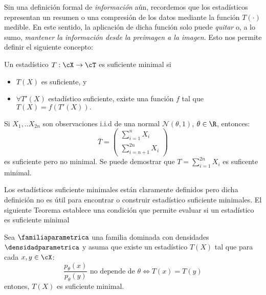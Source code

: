Sin una definición formal de \textit{información} aún, recordemos que los estadísticos representan un resumen o una compresión  de los datos mediante la función $T(\cdot)$ medible. En este sentido, la aplicación de dicha función solo puede \textit{quitar} o, a lo sumo, \textit{mantener la información desde la preimagen a la imagen}. Esto nos permite definir el siguiente concepto:

\begin{definition}
	Un estadístico $T:\cX\rightarrow\cT$ es suficiente minimal si
	\begin{itemize}
		\item $T(X)$ es suficiente, y
		\item $\forall T'(X)$ estadístico suficiente, existe una función $f$ tal que $T(X) = f(T'(X)).$ 
	\end{itemize}
\end{definition}  

\begin{example}
Si $X_1,..X_{2n}$ son observaciones i.i.d de una normal $\mathcal{N}(\theta,1)$, $\theta \in \R$, entonces:
$$
\bar{T}=
\begin{pmatrix}
\sum_{i=1}^{n} X_i\\ 
\sum_{i=n+1}^{2n}X_i
\end{pmatrix}
$$
es suficiente pero no minimal. Se puede demostrar que $T=\sum_{i=1}^{2n} X_i$ es suficente minimal. 
\end{example}

Los estadísticos suficiente minimales están claramente definidos pero dicha definición no es útil para encontrar o construir  estadístico suficiente minimales. El siguiente Teorema establece una condición que permite evaluar si un estadístico es suficiente minimal 

\begin{theorem}
	\label{teo:suficiencia_minimal}
	Sea $\familiaparametrica$ una familia dominada con densidades $\densidadparametrica$ y asuma que existe un estadístico $T(X)$ tal que para cada $x,y\in\cX$:
	\begin{equation}
		\frac{p_\theta(x)}{p_\theta(y)} \text{ no depende de }\theta \Leftrightarrow T(x) = T(y)\label{eq:suf_min_thm}
	\end{equation}
	entones, $T(X)$ es suficiente minimal.
\end{theorem}

